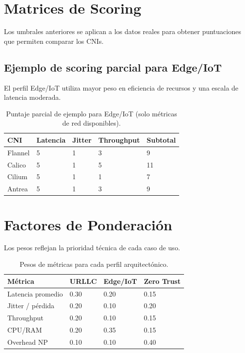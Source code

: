 \documentclass[12pt,a4paper]{article}
\begin{document}
\section{Matrices de Scoring}

Los umbrales anteriores se aplican a los datos reales para obtener puntuaciones que permiten comparar los CNIs.

\subsection{Ejemplo de scoring parcial para Edge/IoT}

El perfil Edge/IoT utiliza mayor peso en eficiencia de recursos y una escala de latencia moderada.

\begin{table}[htbp]
\centering
\caption{Puntaje parcial de ejemplo para Edge/IoT (solo métricas de red disponibles).}
\label{tab:scoring-edge}
\begin{tabular}{p{3cm}p{2cm}p{2cm}p{2cm}p{2cm}}
\toprule
\textbf{CNI} & \textbf{Latencia} & \textbf{Jitter} & \textbf{Throughput} & \textbf{Subtotal} \\
\midrule
Flannel & 5 & 1 & 3 & 9 \\
Calico & 5 & 1 & 5 & 11 \\
Cilium & 5 & 1 & 1 & 7 \\
Antrea & 5 & 1 & 3 & 9 \\
\bottomrule
\end{tabular}
\end{table}

\section{Factores de Ponderación}

Los pesos reflejan la prioridad técnica de cada caso de uso.

\begin{table}[htbp]
\centering
\caption{Pesos de métricas para cada perfil arquitectónico.}
\label{tab:pesos-perfiles}
\begin{tabular}{p{3.5cm}p{2.5cm}p{2.5cm}p{2.5cm}}
\toprule
\textbf{Métrica} & \textbf{URLLC} & \textbf{Edge/IoT} & \textbf{Zero Trust} \\
\midrule
Latencia promedio & 0.30 & 0.20 & 0.15 \\
Jitter / pérdida & 0.20 & 0.10 & 0.20 \\
Throughput & 0.20 & 0.10 & 0.15 \\
CPU/RAM & 0.20 & 0.35 & 0.15 \\
Overhead NP & 0.10 & 0.10 & 0.40 \\
\bottomrule
\end{tabular}
\end{table}
\end{document}
